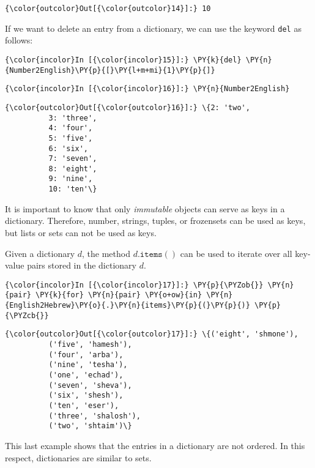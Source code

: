 \begin{Verbatim}[commandchars=\\\{\}]
{\color{outcolor}Out[{\color{outcolor}14}]:} 10
\end{Verbatim}
If we want to delete an entry from a dictionary, we can use the keyword
\texttt{del} as follows:
\begin{Verbatim}[commandchars=\\\{\}]
{\color{incolor}In [{\color{incolor}15}]:} \PY{k}{del} \PY{n}{Number2English}\PY{p}{[}\PY{l+m+mi}{1}\PY{p}{]}
\end{Verbatim}

\begin{Verbatim}[commandchars=\\\{\}]
{\color{incolor}In [{\color{incolor}16}]:} \PY{n}{Number2English}
\end{Verbatim}

\begin{Verbatim}[commandchars=\\\{\}]
{\color{outcolor}Out[{\color{outcolor}16}]:} \{2: 'two',
          3: 'three',
          4: 'four',
          5: 'five',
          6: 'six',
          7: 'seven',
          8: 'eight',
          9: 'nine',
          10: 'ten'\}
\end{Verbatim}      
It is important to know that only \emph{immutable} objects can serve as keys in
a dictionary. Therefore, number, strings, tuples, or frozensets can be
used as keys, but lists or sets can not be used as keys.

Given a dictionary \(d\), the method \(d.\texttt{items}()\) can be used
to iterate over all key-value pairs stored in the dictionary \(d\).
\begin{Verbatim}[commandchars=\\\{\}]
{\color{incolor}In [{\color{incolor}17}]:} \PY{p}{\PYZob{}} \PY{n}{pair} \PY{k}{for} \PY{n}{pair} \PY{o+ow}{in} \PY{n}{English2Hebrew}\PY{o}{.}\PY{n}{items}\PY{p}{(}\PY{p}{)} \PY{p}{\PYZcb{}}
\end{Verbatim}


\begin{Verbatim}[commandchars=\\\{\}]
{\color{outcolor}Out[{\color{outcolor}17}]:} \{('eight', 'shmone'),
          ('five', 'hamesh'),
          ('four', 'arba'),
          ('nine', 'tesha'),
          ('one', 'echad'),
          ('seven', 'sheva'),
          ('six', 'shesh'),
          ('ten', 'eser'),
          ('three', 'shalosh'),
          ('two', 'shtaim')\}
\end{Verbatim}
This last example shows that the entries in a dictionary are not ordered.  In this respect, dictionaries are
similar to sets.

